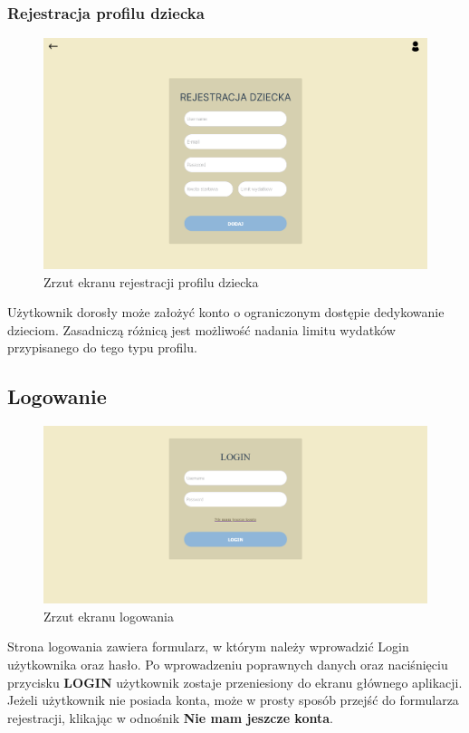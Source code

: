 \documentclass[12pt,a4paper,oneside]{article}
\begin{document}
\subsubsection{Rejestracja profilu dziecka}
\begin{figure}[H]
    \centering
    \includegraphics[width=\hsize,keepaspectratio]{images/register_childs_profile.png}
    \caption{Zrzut ekranu rejestracji profilu dziecka}
\end{figure}
Użytkownik dorosły może założyć konto o ograniczonym dostępie dedykowanie
dzieciom. Zasadniczą różnicą jest możliwość nadania limitu wydatków przypisanego
do tego typu profilu.

\subsection{Logowanie}
\begin{figure}[H]
    \centering
    \includegraphics[width=\hsize,keepaspectratio]{images/login.png}
    \caption{Zrzut ekranu logowania}
\end{figure}
Strona logowania zawiera formularz, w którym należy wprowadzić Login użytkownika
oraz hasło. Po wprowadzeniu poprawnych danych oraz naciśnięciu przycisku
\textbf{LOGIN} użytkownik zostaje przeniesiony do ekranu głównego aplikacji.
Jeżeli użytkownik nie posiada konta, może w prosty sposób przejść do formularza
rejestracji, klikając w odnośnik \textbf{Nie mam jeszcze konta}.
\end{document}
